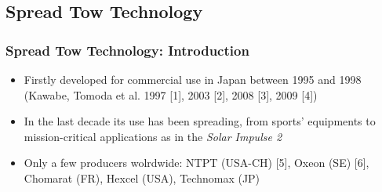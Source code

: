 \documentclass[first,firstsupp,lastsupp,last,hyperref,table]{ETHclass}
\begin{document}
\subsection{Spread Tow Technology}

\begin{frame}
\frametitle{\small Spread Tow Technology: Introduction}
\vspace{-0.25cm}
\centering
\begin{itemize}[label=]
	\item {\small Firstly developed for commercial use in Japan between 1995 and 1998 (Kawabe, Tomoda et al. 1997 [1], 2003 [2], 2008 [3], 2009 [4])}
	\item {\small In the last decade its use has been spreading, from sports' equipments to mission-critical applications as in the \textit{Solar Impulse 2}}
	\item {\small Only a few producers wolrdwide: NTPT (USA-CH) [5], Oxeon (SE) [6], Chomarat (FR), Hexcel (USA), Technomax (JP)}
\end{itemize}
\begin{figure}[!h]
\centering
{}\quad
{}
  \label{fig:thin-ply-examples}
\end{figure}
\end{frame}
\end{document}
